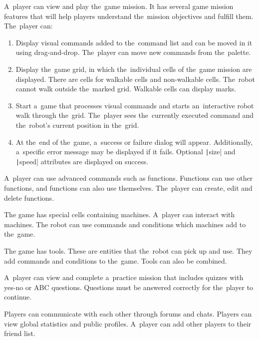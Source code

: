 \begin{enumerate}[label=\textbf{F\arabic*}, ref=\labelenumi]
    \pagebreak
     A~player can view and play the~game mission.
    It has several game mission features that will help players understand the~mission objectives and fulfill them.
    The~player can:
    \begin{enumerate}
        \item Display visual commands added to the~command list and can be moved in it using drag-and-drop.
        The~player can move new commands from the~palette.
        \item Display the~game grid, in which the~individual cells of the~game mission are displayed.
        There are cells for walkable cells and non-walkable cells.
        The~robot cannot walk outside the~marked grid.
        Walkable cells can display marks.
        \item Start a~game that processes visual commands and starts an~interactive robot walk through the~grid.
        The~player sees the~currently executed command and the~robot's current position in the~grid.
        \item At the~end of the~game, a~success or failure dialog will appear.
        Additionally, a~specific error message may be displayed if it fails.
        Optional \texttt|size| and \texttt|speed| attributes are displayed on success.
    \end{enumerate}

    \renewcommand{\labelenumi}{\textbf{F\arabic{enumi}}*}

     A~player can use advanced commands such as functions.
    Functions can use other functions, and functions can also use themselves.
    The~player can create, edit and delete functions.

     The game has special cells containing machines.
    A~player can interact with machines.
    The robot can use commands and conditions which machines add to the~game.

     The game has tools.
    These are entities that the~robot can pick up and use.
    They add commands and conditions to the~game.
    Tools can also be combined.

     A~player can view and complete a~practice mission that includes quizzes with yes-no or ABC questions.
    Questions must be answered correctly for the~player to continue.

     Players can communicate with each other through forums and chats.
    Players can view global statistics and public profiles.
    A~player can add other players to their friend list.


\end{enumerate}
